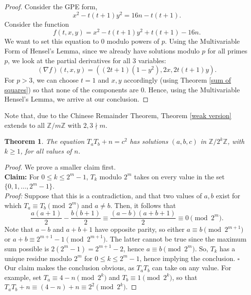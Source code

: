 \documentclass[12pt]{amsart}
\theoremstyle{theorem}
\newtheorem{theorem}{Theorem}
\theoremstyle{definition}
\theoremstyle{plain}
\begin{document}
\begin{proof}
    Consider the GPE form, $$x^2 - t(t+1) y^2 = 16n - t(t+1).$$ Consider the function $$f(t,x,y) = x^2 - t(t+1) y^2 + t(t+1) - 16n.$$ We want to set this equation to $0$ modulo powers of $p$. Using the Multivariable Form of Hensel's Lemma, since we already have solutions modulo $p$ for all primes $p$, we look at the partial derivatives for all $3$ variables: $$(\nabla f)(t,x,y) = ((2t+1)(1 - y^2), 2x, 2t(t+1) y).$$ For $p > 3$, we can choose $t = 1$ and $x,y$ accordingly (using Theorem \ref{sum of squares}) so that none of the components are $0$. Hence, using the Multivariable Hensel's Lemma, we arrive at our conclusion.
\end{proof}

Note that, due to the Chinese Remainder Theorem, Theorem \ref{weak version} extends to all $\mathbb{Z} / m \mathbb{Z}$ with $2, 3 \nmid m$.

\begin{theorem}
    The equation $T_a T_b + n = c^2$ has solutions $(a,b,c)$ in $\mathbb{Z} / 2^k \mathbb{Z}$, with $k \ge 1$, for all values of $n$.
\end{theorem}
\begin{proof}
    We prove a smaller claim first.
\\

    \textbf{Claim:} For $0 \le k \le 2^{m}-1$, $T_k$ modulo $2^m$ takes on every value in the set $\{0, 1, \dots, 2^m - 1\}$. 
    \\

    \emph{Proof:} Suppose that this is a contradiction, and that two values of $a,b$ exist for which $T_a \equiv T_b \pmod{2^m}$ and $a \neq b$. Then, it follows that $$\frac{a(a+1)}{2} - \frac{b(b+1)}{2} \equiv \frac{(a-b)(a+b+1)}{2} \equiv 0 \pmod{2^m}.$$ Note that $a-b$ and $a+b+1$ have opposite parity, so either $a \equiv b \pmod{2^{m+1}}$ or $a + b \equiv 2^{m+1} - 1 \pmod{2^{m+1}}$. The latter cannot be true since the maximum sum possible is $2 \left(2^{m} - 1 \right) = 2^{m+1} - 2$, hence $a \equiv b \pmod{2^m}$. So, $T_k$ has a unique residue modulo $2^m$ for $0 \le k \le 2^{m} - 1$, hence implying the conclusion. \quad\quad\quad\quad\quad\quad\quad\quad\quad\quad\quad\quad\quad\quad\quad\quad\quad $\square$
    \\ 
   
    Our claim makes the conclusion obvious, as $T_a T_b$ can take on any value. For example, set $T_a \equiv 4-n \pmod{2^k}$ and $T_b \equiv 1 \pmod{2^k}$, so that $T_a T_b + n \equiv (4-n) + n \equiv 2^2 \pmod{2^k}$. 
\end{proof}
\end{document}
